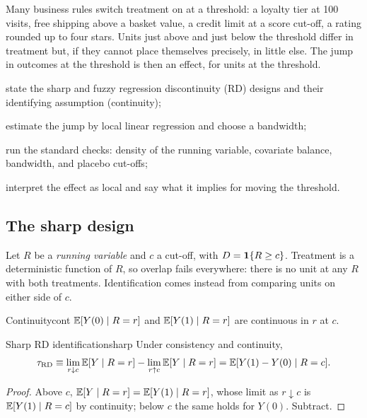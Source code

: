 \documentclass[11pt]{article}
\begin{document}

\begin{decision}
Many business rules switch treatment on at a threshold: a loyalty tier at 100 visits, free shipping above a basket value, a
credit limit at a score cut-off, a rating rounded up to four stars. Units just above and just below the threshold differ in
treatment but, if they cannot place themselves precisely, in little else. The jump in outcomes at the threshold is then an
effect, for units at the threshold.
\end{decision}

\begin{goals}
  \item state the sharp and fuzzy regression discontinuity (RD) designs and their identifying assumption (continuity);
  \item estimate the jump by local linear regression and choose a bandwidth;
  \item run the standard checks: density of the running variable, covariate balance, bandwidth, and placebo cut-offs;
  \item interpret the effect as local and say what it implies for moving the threshold.
\end{goals}

\sectionone

\subsection{The sharp design}

Let $R$ be a \emph{running variable} and $c$ a cut-off, with $D = \mathbf{1}\{R \ge c\}$. Treatment is a deterministic function of $R$, so
overlap fails everywhere: there is no unit at any $R$ with both treatments. Identification comes instead from comparing units on
either side of $c$.

\begin{assum}{Continuity}{cont}
$\mathbb{E}[Y(0) \mid R = r]$ and $\mathbb{E}[Y(1) \mid R = r]$ are continuous in $r$ at $c$.
\end{assum}

\begin{prop}{Sharp RD identification}{sharp}
Under consistency and continuity,
\[
  \tau_{\text{RD}} \equiv \lim_{r \downarrow c}\mathbb{E}[Y \mid R = r] - \lim_{r \uparrow c}\mathbb{E}[Y \mid R = r] = \mathbb{E}[Y(1) - Y(0) \mid R = c].
\]
\end{prop}
\begin{proof}
Above $c$, $\mathbb{E}[Y \mid R = r] = \mathbb{E}[Y(1) \mid R = r]$, whose limit as $r \downarrow c$ is $\mathbb{E}[Y(1) \mid R = c]$ by continuity; below $c$ the same
holds for $Y(0)$. Subtract.
\end{proof}
\end{document}
